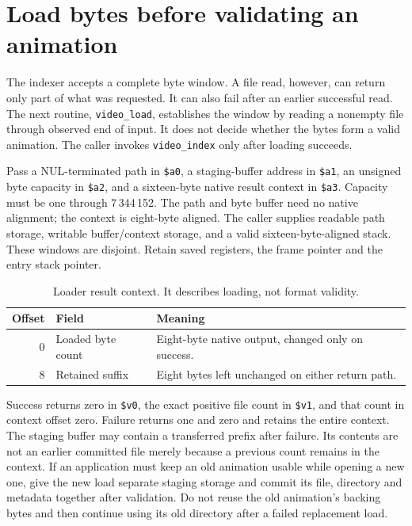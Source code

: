\section{Load bytes before validating an animation}
The indexer accepts a complete byte window. A file read, however, can return only
part of what was requested. It can also fail after an earlier successful read.
The next routine, \texttt{video\_load}, establishes the window by reading a
nonempty file through observed end of input. It does not decide whether the
bytes form a valid animation. The caller invokes \texttt{video\_index} only
after loading succeeds.

Pass a NUL-terminated path in \texttt{\$a0}, a staging-buffer address in
\texttt{\$a1}, an unsigned byte capacity in \texttt{\$a2}, and a sixteen-byte
native result context in \texttt{\$a3}. Capacity must be one through
7\,344\,152. The path and byte buffer need no native alignment; the context
is eight-byte aligned. The caller supplies readable path storage, writable
buffer/context storage, and a valid sixteen-byte-aligned stack. These windows
are disjoint. Retain saved registers, the frame pointer and the entry stack
pointer.

\begin{table}[htbp]
  \centering
  \caption{Loader result context. It describes loading, not format validity.}
  \label{tab:video-load-context}
  \begin{tabular}{r p{1.5in} p{2.8in}}
    \toprule
    Offset & Field             & Meaning                                            \\
    \midrule
    0      & Loaded byte count & Eight-byte native output, changed only on success. \\
    8      & Retained suffix   & Eight bytes left unchanged on either return path.  \\
    \bottomrule
  \end{tabular}
\end{table}

Success returns zero in \texttt{\$v0}, the exact positive file count in
\texttt{\$v1}, and that count in context offset zero. Failure returns one and
zero and retains the entire context. The staging buffer may contain a transferred
prefix after failure. Its contents are not an earlier committed file merely
because a previous count remains in the context. If an application must keep an
old animation usable while opening a new one, give the new load separate staging
storage and commit its file, directory and metadata together after validation.
Do not reuse the old animation's backing bytes and then continue using its old
directory after a failed replacement load.

